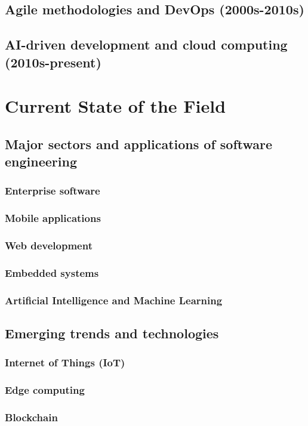\subsection{Agile methodologies and DevOps (2000s-2010s)}
\subsection{AI-driven development and cloud computing (2010s-present)}

\newpage

\section{Current State of the Field}
\subsection{Major sectors and applications of software engineering}
\subsubsection{Enterprise software}
\subsubsection{Mobile applications}
\subsubsection{Web development}
\subsubsection{Embedded systems}
\subsubsection{Artificial Intelligence and Machine Learning}
\subsection{Emerging trends and technologies}
\subsubsection{Internet of Things (IoT)}
\subsubsection{Edge computing}
\subsubsection{Blockchain}
